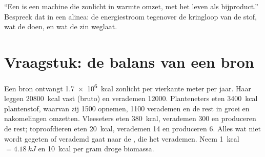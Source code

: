 \begin{exercise}[$\star\star\star$]\label{exo:b1:ecosystem-organization:12}
``Een  is een machine die zonlicht in warmte omzet, met het leven
als bijproduct.'' Bespreek dat in een alinea: de energiestroom tegenover de
kringloop van de stof, wat de  doen, en wat de zin weglaat.
\end{exercise}

\section{Vraagstuk: de balans van een bron}

\begin{problem}
\label{pb:b1:ecosystem-organization:1}
Een bron ontvangt \qty{1.7e6}{kcal} zonlicht per vierkante meter per jaar.
Haar  leggen \qty{20800}{kcal} vast (bruto) en verademen
\qty{12000}{}. Planteneters eten \qty{3400}{kcal} plantenstof, waarvan zij
\qty{1500}{} opnemen, \qty{1100}{} verademen en de rest in groei en
nakomelingen omzetten. Vleeseters eten \qty{380}{kcal}, verademen
\qty{300}{} en produceren de rest; toproofdieren eten \qty{20}{kcal},
verademen \qty{14}{} en produceren \qty{6}{}. Alles wat niet wordt gegeten
of verademd gaat naar de , die het verademen. Neem
\qty{1}{kcal} $= \qty{4.18}{kJ}$ en \qty{10}{kcal} per gram droge biomassa.


\end{problem}
